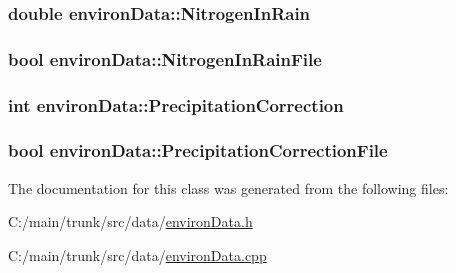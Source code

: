\label{classenviron_data_a4736bdd9c884ebe5ff74ed93891bc748}
\hypertarget{classenviron_data_a0007598ad4764562fe1b1ae6cf058a89}{
\subsubsection[{NitrogenInRain}]{\setlength{\rightskip}{0pt plus 5cm}double {\bf environData::NitrogenInRain}}}
\label{classenviron_data_a0007598ad4764562fe1b1ae6cf058a89}
\hypertarget{classenviron_data_ace78da36801f5240687bc412ce0dbd4b}{
\subsubsection[{NitrogenInRainFile}]{\setlength{\rightskip}{0pt plus 5cm}bool {\bf environData::NitrogenInRainFile}}}
\label{classenviron_data_ace78da36801f5240687bc412ce0dbd4b}
\hypertarget{classenviron_data_a1c8eb583f4a0fba58b4ca1954013e234}{
\subsubsection[{PrecipitationCorrection}]{\setlength{\rightskip}{0pt plus 5cm}int {\bf environData::PrecipitationCorrection}}}
\label{classenviron_data_a1c8eb583f4a0fba58b4ca1954013e234}
\hypertarget{classenviron_data_a6ae5ddf5e5f44a783cf17f02a68783d4}{
\subsubsection[{PrecipitationCorrectionFile}]{\setlength{\rightskip}{0pt plus 5cm}bool {\bf environData::PrecipitationCorrectionFile}}}
\label{classenviron_data_a6ae5ddf5e5f44a783cf17f02a68783d4}


The documentation for this class was generated from the following files:\begin{DoxyCompactItemize}
\item 
C:/main/trunk/src/data/\hyperlink{environ_data_8h}{environData.h}\item 
C:/main/trunk/src/data/\hyperlink{environ_data_8cpp}{environData.cpp}\end{DoxyCompactItemize}
